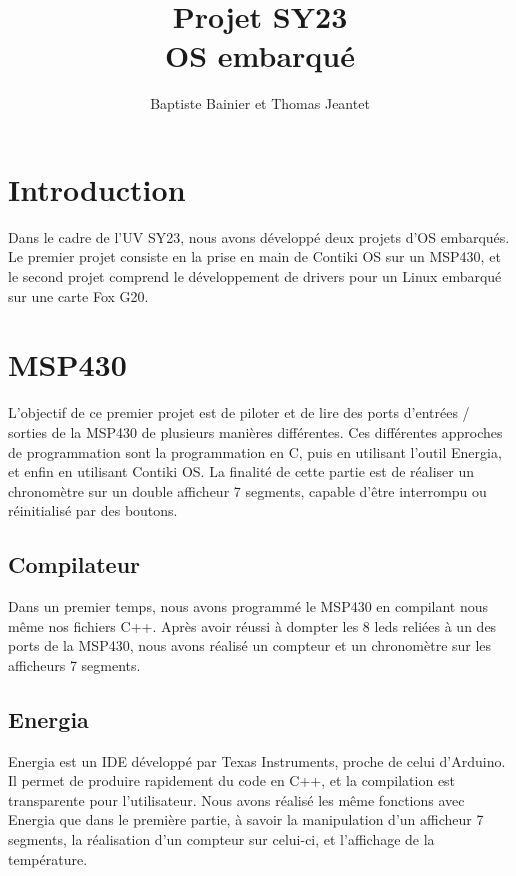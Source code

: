 \documentclass[a4paper,12pt]{article}
\author{Baptiste Bainier et Thomas Jeantet}
\title{Projet SY23\\OS embarqué}
\begin{document}
\maketitle
\newpage
\newpage


\section*{Introduction}

Dans le cadre de l'UV SY23, nous avons développé deux projets d'OS embarqués. Le premier projet consiste en la prise en main de Contiki OS sur un MSP430, et le second projet comprend le développement de drivers pour un Linux embarqué sur une carte Fox G20.

\bigskip
\bigskip
\bigskip
\tableofcontents

\newpage
\section{MSP430}
  L'objectif de ce premier projet est de piloter et de lire des ports d'entrées / sorties de la MSP430 de plusieurs manières différentes. Ces différentes approches de programmation sont la programmation en C, puis en utilisant l'outil Energia, et enfin en utilisant Contiki OS. La finalité de cette partie est de réaliser un chronomètre sur un double afficheur 7 segments, capable d'être interrompu ou réinitialisé par des boutons.

\bigskip
  \subsection{Compilateur}
  	Dans un premier temps, nous avons programmé le MSP430 en compilant nous même nos fichiers C++. Après avoir réussi à dompter les 8 leds reliées à un des ports de la MSP430, nous avons réalisé un compteur et un chronomètre sur les afficheurs 7 segments.

\bigskip
  \subsection{Energia}
  	Energia est un IDE développé par Texas Instruments, proche de celui d'Arduino. Il permet de produire rapidement du code en C++, et la compilation est transparente pour l'utilisateur. Nous avons réalisé les même fonctions avec Energia que dans le première partie, à savoir la manipulation d'un afficheur 7 segments, la réalisation d'un compteur sur celui-ci, et l'affichage de la température.
\end{document}
